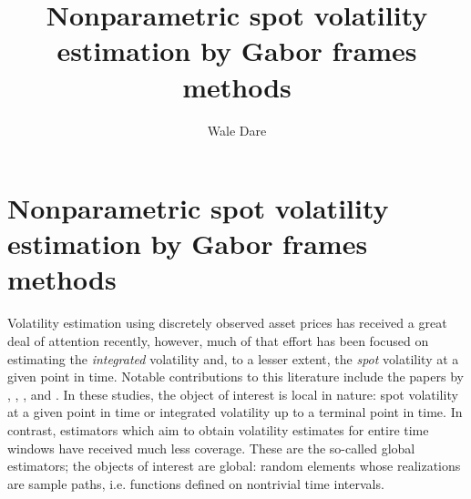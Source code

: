 
\usepackage[toc,page]{appendix}
\usepackage{epsf}
\usepackage{subfig}
\usepackage{graphicx}
\renewcommand{\i}{\mathrm{i}} 
\newcommand{\sumn}{\ensuremath{\sum_{k \in \nats}}\xspace}
\newcommand{\sumi}{\ensuremath{\sum_{k \in \ints}}\xspace}
\newcommand{\sumt}{\ensuremath{\sum_{(h,k) \in \Theta_n}}\xspace}
\newcommand{\sv}{\ensuremath{\sigma_t^2}\xspace}
\newcommand{\bsv}{\ensuremath{\bar{\sigma}^2}\xspace}
\newcommand{\svnt}{\ensuremath{\sigma^2}\xspace}
\newcommand{\svhk}{\ensuremath{\sigma^2_{h,k}}\xspace}
\newcommand{\vh}{\ensuremath{V_h(\phi)}\xspace}
\newcommand{\idp}{\ensuremath{\mu}\xspace}
\newcommand{\svn}{\ensuremath{\hat{\sigma}_{n}^2}\xspace}
\newcommand{\Svn}{\ensuremath{\hat{\Sigma}_n}\xspace}
\newcommand{\svnb}{\ensuremath{\hat{\sigma}_{n,b}^2}\xspace}
\newcommand{\svnN}{\ensuremath{\hat{\sigma}_{t}^2}\xspace}
\newcommand{\hs}{\ensuremath{\mcal{H}}\xspace}
\newcommand{\T}{\ensuremath{\tau}\xspace}
\newcommand{\chk}{\ensuremath{{c}_{h,k}}\xspace}
\newcommand{\cnhk}{\ensuremath{\hat{c}_{h,k}}\xspace}
\newcommand{\ivp}{\ensuremath{\sigma}\xspace}
\newcommand{\inner}[2]{\ensuremath{\langle{#1},{#2}\rangle}\xspace}
\newcommand{\ghk}{\ensuremath{g_{h,k}}\xspace}
\newcommand{\tghk}{\ensuremath{\tilde{g}_{h,k}}\xspace}
\newcommand{\btghki}{\ensuremath{\overline{\tilde{g}_{h,k}(t_i)}}\xspace}
\newcommand{\btghks}{\ensuremath{\overline{\tilde{g}_{h,k}(s)}}\xspace}
\newcommand{\tg}{\ensuremath{\tilde{g}}\xspace}
\newcommand{\hkints}{\ensuremath{h,k \in \ints}\xspace}
\author{Wale Dare}
\title {Nonparametric spot volatility estimation by Gabor frames methods}

\chapter {Nonparametric spot volatility estimation by Gabor frames methods}
Volatility estimation using discretely observed asset prices has received a great deal of attention recently, however,  much of that effort has been focused on 
estimating the \emph{integrated} volatility and, to a lesser extent, the \emph{spot} volatility at a given point in time. 
Notable contributions to this literature include  the papers by \cite{Foster1996}, \cite{Fan2008},   \cite{Florens1993}, and  \cite{BN2004}.
In these studies, the object of interest is local in nature: spot volatility at a given point in time or integrated volatility up to a terminal point in time. In contrast,  estimators which aim  to obtain  volatility estimates  for  entire time windows  have received much less coverage. These are the so-called global estimators; the objects of interest are global:   random elements whose realizations are sample paths, i.e. functions defined on  nontrivial time intervals.     



